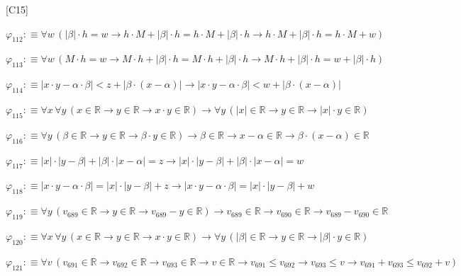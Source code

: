 \begin{fullproof}{[C15]}
\begin{abbrevlist}
\item $\varphi_{112} :\equiv \forall w\,(\lvert \beta \rvert \cdot h = w \to h \cdot M + \lvert \beta \rvert \cdot h = h \cdot M + \lvert \beta \rvert \cdot h \to h \cdot M + \lvert \beta \rvert \cdot h = h \cdot M + w)$
\item $\varphi_{113} :\equiv \forall w\,(M \cdot h = w \to M \cdot h + \lvert \beta \rvert \cdot h = M \cdot h + \lvert \beta \rvert \cdot h \to M \cdot h + \lvert \beta \rvert \cdot h = w + \lvert \beta \rvert \cdot h)$
\item $\varphi_{114} :\equiv \lvert x \cdot y - \alpha \cdot \beta \rvert < z + \lvert \beta \cdot (x - \alpha) \rvert \to \lvert x \cdot y - \alpha \cdot \beta \rvert < w + \lvert \beta \cdot (x - \alpha) \rvert$
\item $\varphi_{115} :\equiv \forall x\,\forall y\,(x \in \mathbb{R} \to y \in \mathbb{R} \to x \cdot y \in \mathbb{R}) \to \forall y\,(\lvert x \rvert \in \mathbb{R} \to y \in \mathbb{R} \to \lvert x \rvert \cdot y \in \mathbb{R})$
\item $\varphi_{116} :\equiv \forall y\,(\beta \in \mathbb{R} \to y \in \mathbb{R} \to \beta \cdot y \in \mathbb{R}) \to \beta \in \mathbb{R} \to x - \alpha \in \mathbb{R} \to \beta \cdot (x - \alpha) \in \mathbb{R}$
\item $\varphi_{117} :\equiv \lvert x \rvert \cdot \lvert y - \beta \rvert + \lvert \beta \rvert \cdot \lvert x - \alpha \rvert = z \to \lvert x \rvert \cdot \lvert y - \beta \rvert + \lvert \beta \rvert \cdot \lvert x - \alpha \rvert = w$
\item $\varphi_{118} :\equiv \lvert x \cdot y - \alpha \cdot \beta \rvert = \lvert x \rvert \cdot \lvert y - \beta \rvert + z \to \lvert x \cdot y - \alpha \cdot \beta \rvert = \lvert x \rvert \cdot \lvert y - \beta \rvert + w$
\item $\varphi_{119} :\equiv \forall y\,(v_{689} \in \mathbb{R} \to y \in \mathbb{R} \to v_{689} - y \in \mathbb{R}) \to v_{689} \in \mathbb{R} \to v_{690} \in \mathbb{R} \to v_{689} - v_{690} \in \mathbb{R}$
\item $\varphi_{120} :\equiv \forall x\,\forall y\,(x \in \mathbb{R} \to y \in \mathbb{R} \to x \cdot y \in \mathbb{R}) \to \forall y\,(\lvert \beta \rvert \in \mathbb{R} \to y \in \mathbb{R} \to \lvert \beta \rvert \cdot y \in \mathbb{R})$
\item $\varphi_{121} :\equiv \forall v\,(v_{691} \in \mathbb{R} \to v_{692} \in \mathbb{R} \to v_{693} \in \mathbb{R} \to v \in \mathbb{R} \to v_{691} \leq v_{692} \to v_{693} \leq v \to v_{691} + v_{693} \leq v_{692} + v)$

\end{abbrevlist}
\end{fullproof}
